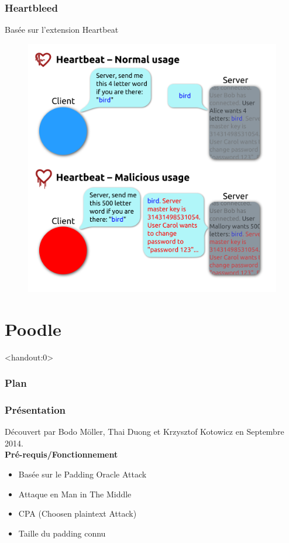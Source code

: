 \begin{frame}
  \frametitle{Heartbleed}
 Basée sur l'extension Heartbeat
  \begin{figure}[h]
    \centering
  \includegraphics[scale=0.17]{Heartbleed}
  \end{figure}
\end{frame}


\section{Poodle}

\begin{frame}<handout:0>
  \frametitle{Plan}
  \tableofcontents[currentsection]
\end{frame}

\begin{frame}
  \frametitle{Présentation}
  Découvert par Bodo Möller, Thai Duong et Krzysztof Kotowicz en Septembre 2014.\\
  \pause
\textbf{Pré-requis/Fonctionnement}
  \begin{itemize}
  \item Basée sur le Padding Oracle Attack
  \item Attaque en Man in The Middle
  \item CPA (Choosen plaintext Attack)
  \item Taille du padding connu
  \end{itemize}

\end{frame}

